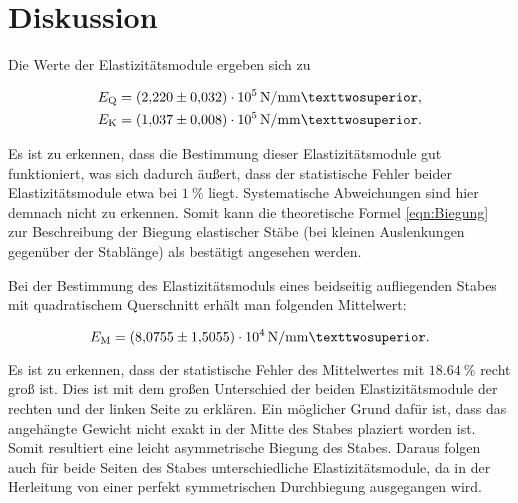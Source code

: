 \section{Diskussion}
\label{sec:Diskussion}

Die Werte der Elastizitätsmodule ergeben sich zu

\begin{align*}
E_\text{Q} &= \SI{2.220+-0.032e5}{\newton\per\milli\meter²},\\
E_\text{K} &= \SI{1.037+-0.008e5}{\newton\per\milli\meter²}.
\end{align*}

Es ist zu erkennen, dass die Bestimmung dieser Elastizitätsmodule gut 
funktioniert, was sich dadurch äußert, dass der statistische Fehler
beider Elastizitätsmodule etwa bei $\SI{1}{\percent}$ liegt. 
Systematische Abweichungen sind hier demnach nicht zu erkennen. Somit 
kann die theoretische Formel \eqref{eqn:Biegung} zur Beschreibung 
der Biegung elastischer Stäbe (bei kleinen Auslenkungen gegenüber der
Stablänge) als bestätigt angesehen werden.

Bei der Bestimmung des Elastizitätsmoduls eines beidseitig aufliegenden
Stabes mit quadratischem Querschnitt erhält man folgenden Mittelwert: 

\begin{equation*}
E_\text{M} = \SI{8.0755+-1.5055e4}{\newton\per\milli\meter²}.
\end{equation*}

Es ist zu erkennen, dass der statistische Fehler des Mittelwertes mit 
$\SI{18.64}{\percent}$ recht groß ist. Dies ist mit dem großen Unterschied
der beiden Elastizitätsmodule der rechten und der linken Seite zu 
erklären. Ein möglicher Grund dafür ist, dass das angehängte Gewicht
nicht exakt in der Mitte des Stabes plaziert worden ist. Somit resultiert
eine leicht asymmetrische Biegung des Stabes. Daraus folgen auch für beide
Seiten des Stabes unterschiedliche Elastizitätsmodule, da in der Herleitung
von einer perfekt symmetrischen Durchbiegung ausgegangen wird. 

